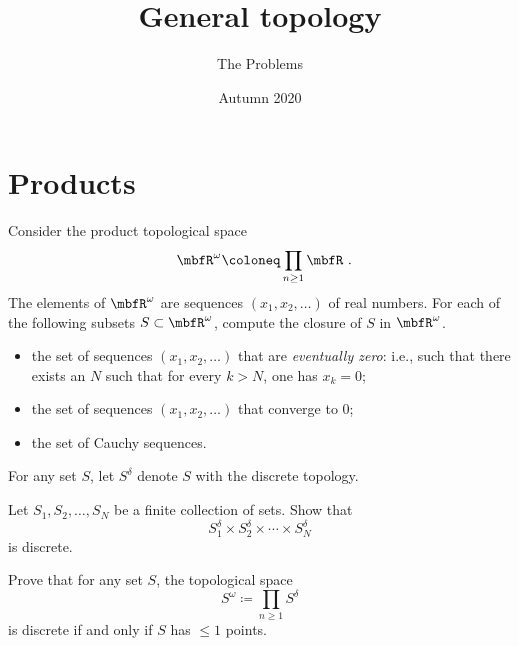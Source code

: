 \documentclass[a4paper,twoside,nols,nobib]{tufte-handout}
\title{General topology}
\author{The Problems}
\date{Autumn 2020}
\begin{document}
\maketitle

\section*{Products}

\begin{Problem}
	\noindent
	Consider the product topological space
	\[
		\RR^{\omega} \coloneq \prod_{n \geq 1} \RR \period
	\]
	The elements of $\RR^{\omega}$ are sequences $(x_1,x_2,\dots)$ of real numbers.
	For each of the following subsets $S \subset \RR^{\omega}$, compute the closure of $S$ in $\RR^{\omega}$.
	\begin{itemize}
		\item the set of sequences $(x_1,x_2,\dots)$ that are \emph{eventually zero}: i.e., such that there exists an $N$ such that for every $k > N$, one has $x_k = 0$;
		\item the set of sequences $(x_1,x_2,\dots)$ that converge to $0$;
		\item the set of Cauchy sequences. 	
	\end{itemize}
\end{Problem}


\begin{ntn*}
	For any set $S$, let $S^{\delta}$ denote $S$ with the discrete topology.
\end{ntn*}


\begin{Problem}
	\noindent
	Let $S_1, S_2, \dots, S_N$ be a finite collection of sets.
	Show that
	\[
		S_1^{\delta} \times S_2^{\delta} \times \cdots \times S_N^{\delta}
	\]
	is discrete.
\end{Problem}


\begin{Problem}
	\noindent
	Prove that for any set $S$, the topological space
	\[
		S^{\omega} \coloneq \prod_{n \geq 1} S^{\delta}
	\]
	is discrete if and only if $S$ has $\leq 1$ points.
\end{Problem}
\end{document}
